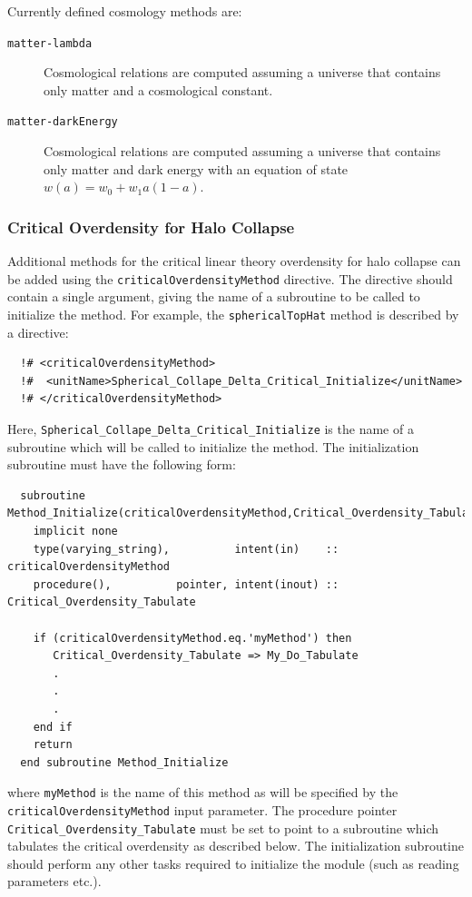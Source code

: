Currently defined cosmology methods are:
\begin{description}
 \item [{\tt matter-lambda}] Cosmological relations are computed assuming a universe that contains only matter and a cosmological constant.
 \item [{\tt matter-darkEnergy}] Cosmological relations are computed assuming a universe that contains only matter and dark energy with an equation of state $w(a)=w_0+w_1a(1-a)$.
\end{description}

\subsubsection{Critical Overdensity for Halo Collapse}

Additional methods for the critical linear theory overdensity for halo collapse can be added using the {\tt criticalOverdensityMethod} directive. The directive should contain a single argument, giving the name of a subroutine to be called to initialize the method. For example, the {\tt sphericalTopHat} method is described by a directive:
\begin{verbatim}
  !# <criticalOverdensityMethod>
  !#  <unitName>Spherical_Collape_Delta_Critical_Initialize</unitName>
  !# </criticalOverdensityMethod>
\end{verbatim}
Here, {\tt Spherical\_Collape\_Delta\_Critical\_Initialize} is the name of a subroutine which will be called to initialize the method. The initialization subroutine must have the following form:
\begin{verbatim}
  subroutine Method_Initialize(criticalOverdensityMethod,Critical_Overdensity_Tabulate)
    implicit none
    type(varying_string),          intent(in)    :: criticalOverdensityMethod
    procedure(),          pointer, intent(inout) :: Critical_Overdensity_Tabulate
    
    if (criticalOverdensityMethod.eq.'myMethod') then
       Critical_Overdensity_Tabulate => My_Do_Tabulate
       .
       .
       .
    end if
    return
  end subroutine Method_Initialize
\end{verbatim}
where {\tt myMethod} is the name of this method as will be specified by the {\tt criticalOverdensityMethod} input parameter. The procedure pointer {\tt Critical\_Overdensity\_Tabulate} must be set to point to a subroutine which tabulates the critical overdensity as described below. The initialization subroutine should perform any other tasks required to initialize the module (such as reading parameters etc.).

